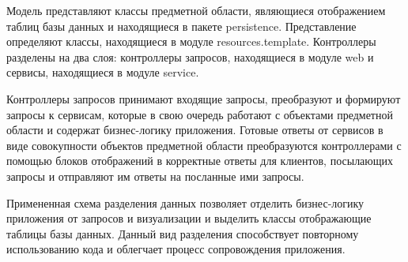 Модель представляют классы предметной области, являющиеся отображением таблиц базы данных и находящиеся в пакете persistence.
Представление определяют классы, находящиеся в модуле resources.template.
Контроллеры разделены на два слоя: контроллеры запросов, находящиеся в модуле web и сервисы, находящиеся в модуле service.

Контроллеры запросов принимают входящие запросы, преобразуют и формируют запросы к сервисам, которые в свою очередь работают с объектами предметной области и содержат бизнес-логику приложения.
Готовые ответы от сервисов в виде совокупности объектов предметной области преобразуются контроллерами с помощью блоков отображений в корректные ответы для клиентов, посылающих запросы и отправляют им ответы на посланные ими запросы.

Примененная схема разделения данных позволяет отделить бизнес-логику приложения от запросов и визуализации и выделить классы отображающие таблицы базы данных.
Данный вид разделения способствует повторному использованию кода и облегчает процесс сопровождения приложения.

\clearpage